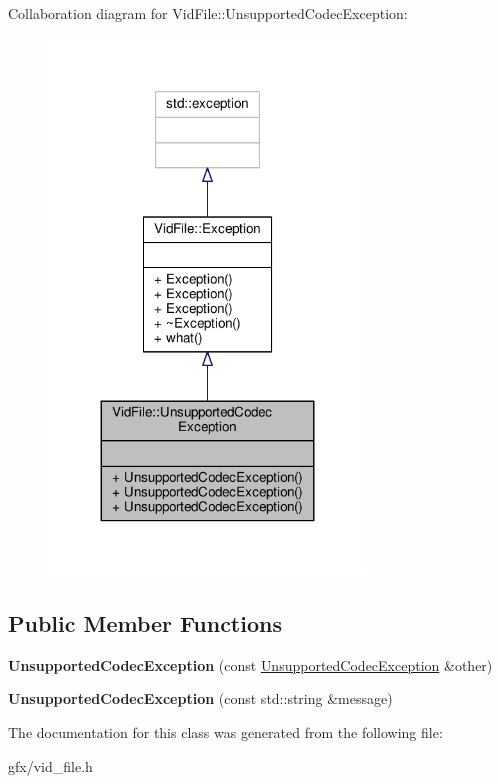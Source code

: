 Collaboration diagram for Vid\+File\+:\+:Unsupported\+Codec\+Exception\+:
\nopagebreak
\begin{figure}[H]
\begin{center}
\leavevmode
\includegraphics[width=239pt]{da/da4/classVidFile_1_1UnsupportedCodecException__coll__graph}
\end{center}
\end{figure}
\subsection*{Public Member Functions}
\begin{DoxyCompactItemize}
\item 
{\bfseries Unsupported\+Codec\+Exception} (const \hyperlink{classVidFile_1_1UnsupportedCodecException}{Unsupported\+Codec\+Exception} \&other)\hypertarget{classVidFile_1_1UnsupportedCodecException_a9e85005e4fb22088dbdb80ed05612a70}{}\label{classVidFile_1_1UnsupportedCodecException_a9e85005e4fb22088dbdb80ed05612a70}

\item 
{\bfseries Unsupported\+Codec\+Exception} (const std\+::string \&message)\hypertarget{classVidFile_1_1UnsupportedCodecException_afe2607602007ceb793c0ae8bb0e8b25d}{}\label{classVidFile_1_1UnsupportedCodecException_afe2607602007ceb793c0ae8bb0e8b25d}

\end{DoxyCompactItemize}


The documentation for this class was generated from the following file\+:\begin{DoxyCompactItemize}
\item 
gfx/vid\+\_\+file.\+h\end{DoxyCompactItemize}
